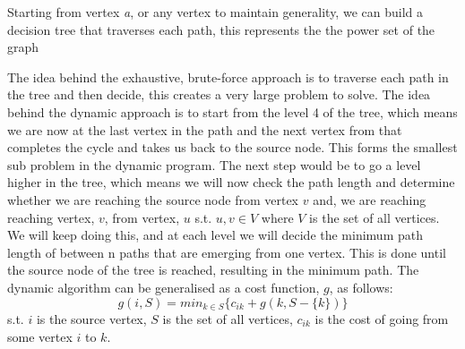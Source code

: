 \documentclass[12pt]{report}
\begin{document}
Starting from vertex \textit{a}, or any vertex to maintain generality, we can build a decision tree that traverses each path, this represents the the power set of the graph
  \begin{center}
  \end{center}
The idea behind the exhaustive, brute-force approach is to traverse each path in the tree and then decide, this creates a very large problem to solve. The idea behind the dynamic approach is to start from the level 4 of the tree, which means we are now at the last vertex in the path and the next vertex from that completes the cycle and takes us back to the source node. This forms the smallest sub problem in the dynamic program. The next step would be to go a level higher in the tree, which means we will now check the path length and determine whether we are reaching the source node from vertex $v$ and, we are reaching reaching vertex, $v$, from vertex, $u$ s.t. $u,v \in V$ where $V$ is the set of all vertices. We will keep doing this, and at each level we will decide the minimum path length of between n paths that are emerging from one vertex. This is done until the source node of the tree is reached, resulting in the minimum path. The dynamic algorithm can be generalised as a cost function, $g$, as follows:
$$g(i, S) = min_{k\in S} \bigg\{c_{ik} + g(k, S-\{k\})\bigg\}$$
s.t. $i$ is the source vertex, $S$ is the set of all vertices, $c_{ik}$ is the cost of going from some vertex $i$ to $k$. 
\end{document}
